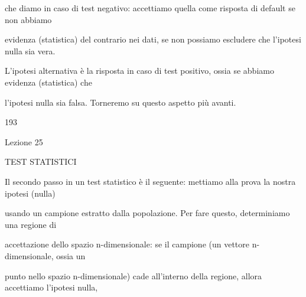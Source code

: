 \documentclass[a4paper,portrait,12pt]{article}
\begin{document}
\begin{flushleft}
che diamo in caso di test negativo: accettiamo quella come risposta di default se non abbiamo
\end{flushleft}


\begin{flushleft}
evidenza (statistica) del contrario nei dati, se non possiamo escludere che l'ipotesi nulla sia vera.
\end{flushleft}


\begin{flushleft}
L'ipotesi alternativa \`{e} la risposta in caso di test positivo, ossia se abbiamo evidenza (statistica) che
\end{flushleft}


\begin{flushleft}
l'ipotesi nulla sia falsa. Torneremo su questo aspetto più avanti.
\end{flushleft}


193





\begin{flushleft}
Lezione 25
\end{flushleft}










\begin{flushleft}
TEST STATISTICI
\end{flushleft}





\begin{flushleft}
Il secondo passo in un test statistico \`{e} il seguente: mettiamo alla prova la nostra ipotesi (nulla)
\end{flushleft}


\begin{flushleft}
usando un campione estratto dalla popolazione. Per fare questo, determiniamo una regione di
\end{flushleft}


\begin{flushleft}
accettazione dello spazio n-dimensionale: se il campione (un vettore n-dimensionale, ossia un
\end{flushleft}


\begin{flushleft}
punto nello spazio n-dimensionale) cade all'interno della regione, allora accettiamo l'ipotesi nulla,
\end{flushleft}
\end{document}
